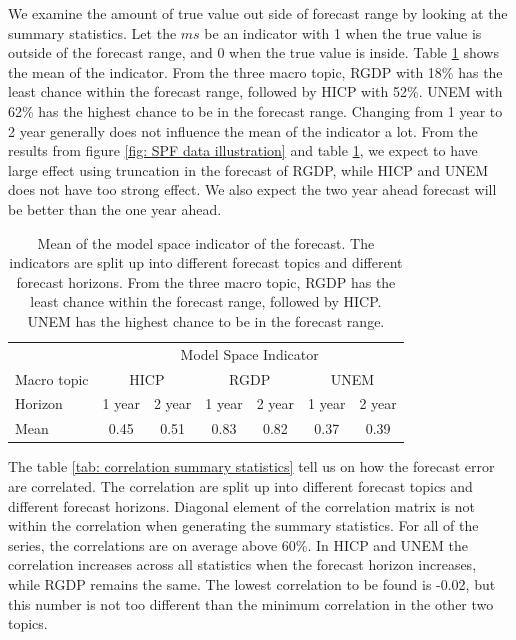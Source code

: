 \documentclass[]{article}
\begin{document}
We examine the amount of true value out side of forecast range by
looking at the summary statistics. Let the \(ms\) be an indicator with 1
when the true value is outside of the forecast range, and 0 when the
true value is inside. Table \ref{tab: modelspace summary statistics}
shows the mean of the indicator. From the three macro topic, RGDP with
18\% has the least chance within the forecast range, followed by HICP
with 52\%. UNEM with 62\% has the highest chance to be in the forecast
range. Changing from 1 year to 2 year generally does not influence the
mean of the indicator a lot. From the results from figure
\ref{fig: SPF data illustration} and table
\ref{tab: modelspace summary statistics}, we expect to have large effect
using truncation in the forecast of RGDP, while HICP and UNEM does not
have too strong effect. We also expect the two year ahead forecast will
be better than the one year ahead.

\begin{table}[!h]
\centering
\caption{Mean of the model space indicator of the forecast. The indicators are split up into different forecast topics and different forecast horizons. From the three macro topic, RGDP has the least chance within the forecast range, followed by HICP. UNEM has the highest chance to be in the forecast range.}
\label{tab: modelspace summary statistics}
\begin{tabular}{lcccccc}
\hline
&\multicolumn{6}{c}{Model Space Indicator}\\
\cmidrule{2-7}
Macro topic & \multicolumn{2}{c}{HICP} & \multicolumn{2}{c}{RGDP} & \multicolumn{2}{c}{UNEM} \\
\cmidrule{2-3} \cmidrule{4-5}\cmidrule{6-7}
Horizon     & 1 year & 2 year & 1 year & 2 year & 1 year & 2 year \\ 
\cmidrule{2-2} \cmidrule{3-3} \cmidrule{4-4} \cmidrule{5-5} \cmidrule{6-6} \cmidrule{7-7}
Mean        & 0.45        & 0.51         & 0.83        & 0.82        & 0.37         & 0.39       \\
\hline
\end{tabular}
\end{table}

The table \ref{tab: correlation summary statistics} tell us on how the
forecast error are correlated. The correlation are split up into
different forecast topics and different forecast horizons. Diagonal
element of the correlation matrix is not within the correlation when
generating the summary statistics. For all of the series, the
correlations are on average above 60\%. In HICP and UNEM the correlation
increases across all statistics when the forecast horizon increases,
while RGDP remains the same. The lowest correlation to be found is
-0.02, but this number is not too different than the minimum correlation
in the other two topics.
\end{document}
